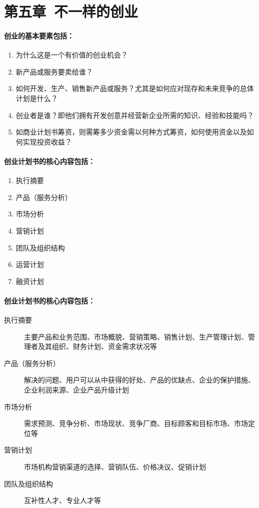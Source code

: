\documentclass[UTF8]{article}
\begin{document}
\section{第五章\ 不一样的创业}
\paragraph{创业的基本要素包括：}
\begin{enumerate}[1)]
\item 为什么这是一个有价值的创业机会？
\item 新产品或服务要卖给谁？
\item 如何开发、生产、销售新产品或服务？尤其是如何应对现存和未来竞争的总体计划是什么？
\item 创业者是谁？即他们拥有开发创意并经营新企业所需的知识、经验和技能吗？
\item 如商业计划书筹资，则需筹多少资金需以何种方式筹资，如何使用资金以及如何实现投资收益？
\end{enumerate}
\paragraph{创业计划书的核心内容包括：}
\begin{enumerate}[1)]
    \item 执行摘要
    \item 产品（服务分析）
    \item 市场分析
    \item 营销计划
    \item 团队及组织结构
    \item 运营计划
    \item 融资计划
\end{enumerate}
\paragraph{创业计划书的核心内容包括：}
\begin{description}
\item [执行摘要]主要产品和业务范围、市场概貌、营销策略、销售计划、生产管理计划、管理者及其组织、财务计划、资金需求状况等
\item [产品（服务分析）]解决的问题、用户可以从中获得的好处、产品的优缺点、企业的保护措施、企业利润来源、企业产品升级计划
\item [市场分析] 需求预测、竞争分析、市场现状、竞争厂商、目标顾客和目标市场、市场定位等
\item [营销计划]市场机构营销渠道的选择、营销队伍、价格决议、促销计划
\item[团队及组织结构] 互补性人才、专业人才等
\end{description} 
\end{document}

